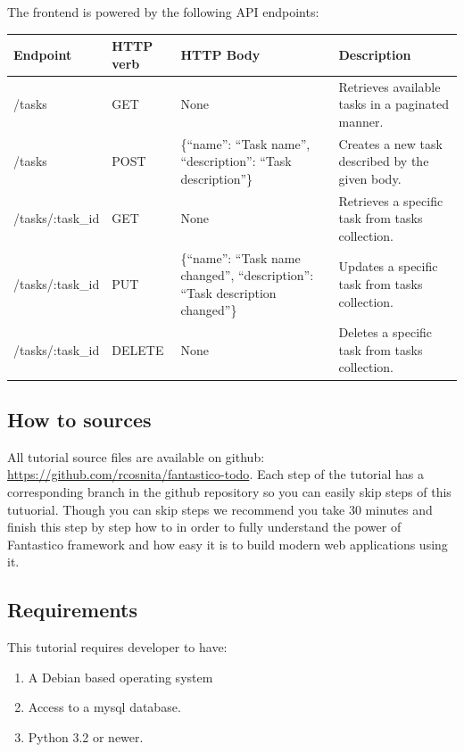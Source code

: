 \documentclass[letterpaper,10pt,english]{sphinxmanual}
\begin{document}
The frontend is powered by the following API endpoints:

\begin{tabulary}{\linewidth}{|L|L|L|L|}
\hline

\textbf{Endpoint}
 & 
\textbf{HTTP verb}
 & 
\textbf{HTTP Body}
 & 
\textbf{Description}
\\\hline

/tasks
 & 
GET
 & 
None
 & 
Retrieves available tasks in a paginated manner.
\\\hline

/tasks
 & 
POST
 & 
\{``name'': ``Task name'', ``description'': ``Task description''\}
 & 
Creates a new task described by the given body.
\\\hline

/tasks/:task\_id
 & 
GET
 & 
None
 & 
Retrieves a specific task from tasks collection.
\\\hline

/tasks/:task\_id
 & 
PUT
 & 
\{``name'': ``Task name changed'', ``description'': ``Task description changed''\}
 & 
Updates a specific task from tasks collection.
\\\hline

/tasks/:task\_id
 & 
DELETE
 & 
None
 & 
Deletes a specific task from tasks collection.
\\\hline
\end{tabulary}



\subsection{How to sources}
\label{how_to/todo/index:how-to-sources}
All tutorial source files are available on github: \href{https://github.com/rcosnita/fantastico-todo}{https://github.com/rcosnita/fantastico-todo}. Each step of the tutorial
has a corresponding branch in the github repository so you can easily skip steps of this tutuorial. Though you can skip steps
we recommend you take 30 minutes and finish this step by step how to in order to fully understand the power of Fantastico
framework and how easy it is to build modern web applications using it.


\subsection{Requirements}
\label{how_to/todo/index:requirements}
This tutorial requires developer to have:
\begin{enumerate}
\item {} 
A Debian based operating system

\item {} 
Access to a mysql database.

\item {} 
Python 3.2 or newer.

\end{enumerate}
\end{document}
